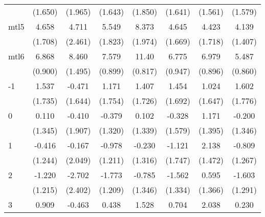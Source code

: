 \documentclass{article}
\begin{document}
{\begin{longtable}{l*{7}{c}}
                &  (1.650)         &  (1.965)         &  (1.643)         &  (1.850)         &  (1.641)         &  (1.561)         &  (1.579)         \\
mtl5            &    4.658\sym{*}  &    4.711         &    5.549\sym{**} &    8.373\sym{***}&    4.645\sym{**} &    4.423\sym{*}  &    4.139\sym{**} \\
                &  (1.708)         &  (2.461)         &  (1.823)         &  (1.974)         &  (1.669)         &  (1.718)         &  (1.407)         \\
mtl6            &    6.868\sym{***}&    8.460\sym{***}&    7.579\sym{***}&    11.40\sym{***}&    6.775\sym{***}&    6.979\sym{***}&    5.487\sym{***}\\
                &  (0.900)         &  (1.495)         &  (0.899)         &  (0.817)         &  (0.947)         &  (0.896)         &  (0.860)         \\
-1              &    1.537         &   -0.471         &    1.171         &    1.407         &    1.454         &    1.024         &    1.602         \\
                &  (1.735)         &  (1.644)         &  (1.754)         &  (1.726)         &  (1.692)         &  (1.647)         &  (1.776)         \\
0               &    0.110         &   -0.410         &   -0.379         &    0.102         &   -0.328         &    1.171         &   -0.200         \\
                &  (1.345)         &  (1.907)         &  (1.320)         &  (1.339)         &  (1.579)         &  (1.395)         &  (1.346)         \\
1               &   -0.416         &   -0.167         &   -0.978         &   -0.230         &   -1.121         &    2.138         &   -0.809         \\
                &  (1.244)         &  (2.049)         &  (1.211)         &  (1.316)         &  (1.747)         &  (1.472)         &  (1.267)         \\
2               &   -1.220         &   -2.702         &   -1.773         &   -0.785         &   -1.562         &    0.595         &   -1.603         \\
                &  (1.215)         &  (2.402)         &  (1.209)         &  (1.346)         &  (1.334)         &  (1.366)         &  (1.291)         \\
3               &    0.909         &   -0.463         &    0.438         &    1.528         &    0.704         &    2.038         &    0.230         \\

\end{longtable}}
\end{document}
